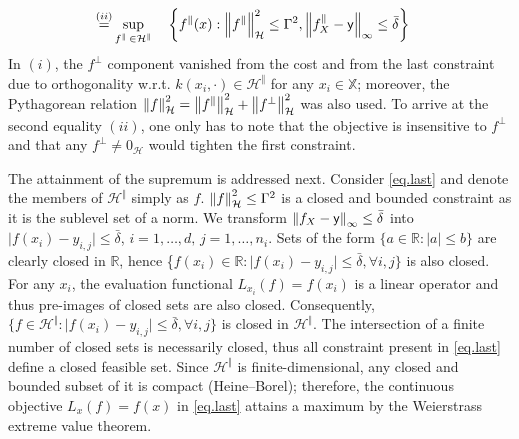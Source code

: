 \begin{my_proof}
\begin{align}
		\overset{(ii)}{=}& \sup_{f^{\Vert} \, \in \mathcal{H}^{\Vert}} &&\left\{ f^{\Vert}(x) : \left\| f^{\Vert} \right\|_\mathcal{H}^2 \leq \Gamma^2, \left\| f^{\Vert}_{X} - \mathsf{y} \right\|_\infty \leq \bar \delta \right\} \label{eq.last}
	\end{align}
	In $(i)$, the $f^\perp$ component vanished from the cost and from the last constraint due to orthogonality w.r.t. $k(x_i,\cdot) \in \mathcal{H}^\Vert$ for any $x_i \in \mathds{X}$; moreover, the Pythagorean relation $\left\| f \right\|_\mathcal{H}^2 = \left\| f^{\Vert} \right\|_\mathcal{H}^2 + \left\| f^\perp \right\|_\mathcal{H}^2$ was also used. To arrive at the second equality $(ii)$, one only has to note that the objective is insensitive to $f^\perp$ and that any $f^\perp \neq 0_{\mathcal{H}}$ would tighten the first constraint. 
	
	The attainment of the supremum is addressed next. Consider \eqref{eq.last} and denote the members of $\mathcal{H}^\Vert$ simply as $f$. $\left\| f \right\|_\mathcal{H}^2 \leq \Gamma^2$ is a closed and bounded constraint as it is the sublevel set of a norm. We transform $\left\| f_{X} - \mathsf{y} \right\|_\infty \leq \bar \delta$ into $\vert f(x_i) - y_{i,j} \vert \leq \bar \delta$, $i=1,\dots,d, \, j =1,\dots,n_i$. Sets of the form $\{a \in \mathbb{R}: \vert a \vert \leq b \}$ are clearly closed in $\mathbb{R}$, hence \{$f(x_i) \in \mathbb{R} : \vert f(x_i) - y_{i,j}\vert \leq \bar \delta, \forall i,j \}$ is also closed. For any $x_i$, the evaluation functional $L_{x_i}(f) = f(x_i)$ is a linear operator and thus pre-images of closed sets are also closed. Consequently, $\{f \in \mathcal{H}^\Vert : \vert f(x_i) - y_{i,j}\vert \leq \bar \delta, \forall i,j \}$ is closed in $\mathcal{H}^\Vert$. The intersection of a finite number of closed sets is necessarily closed, thus all constraint present in \eqref{eq.last} define a closed feasible set. Since $\mathcal{H}^{\Vert}$ is finite-dimensional, any closed and bounded subset of it is compact (Heine–Borel); therefore, the continuous objective $L_x(f) = f(x)$ in \eqref{eq.last} attains a maximum by the Weierstrass extreme value theorem. 
	

\end{my_proof}
